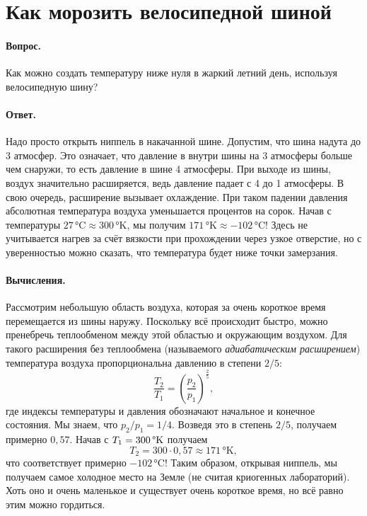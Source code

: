 \section{Как морозить велосипедной шиной}


\paragraph{Вопрос.}
Как можно создать температуру ниже нуля в жаркий летний день, используя велосипедную шину?

\paragraph{Ответ.}
Надо просто открыть ниппель в накачанной шине.
Допустим, что шина надута до 3 атмосфер.
Это означает, что давление в внутри шины на 3 атмосферы больше чем снаружи, то есть давление в шине 4 атмосферы.
При выходе из шины, воздух значительно расширяется, ведь давление падает с 4 до 1 атмосферы.
В свою очередь, расширение вызывает охлаждение.
При таком падении давления абсолютная температура воздуха уменьшается процентов на сорок.
Начав с температуры $27 \,\text{°C} \approx 300\, \text{°K}$, мы получим $171 \,\text{°K} \approx -102\, \text{°C}$!
Здесь не учитывается нагрев за счёт вязкости при прохождении через узкое отверстие, но с уверенностью можно сказать, что температура будет ниже точки замерзания.

\paragraph{Вычисления.}
Рассмотрим небольшую область воздуха, которая за очень короткое время перемещается из шины наружу.
Поскольку всё происходит быстро, можно пренебречь теплообменом между этой областью и окружающим воздухом.
Для такого расширения без теплообмена (называемого \emph{адиабатическим расширением}) температура воздуха пропорциональна давлению в степени $2/5$:
\[\frac{T_2}{T_1}=\left(\frac{p_2}{p_1}\right)^{\tfrac{2}{5}},\]
где индексы температуры и давления обозначают начальное и конечное состояния.
Мы знаем, что $p_2/p_1=1/4$.
Возведя это в степень $2/5$, получаем примерно $0{,}57$.
Начав с $T_1=300 \,\degree\text{K}$ получаем
\[T_2=300 \cdot 0{,}57 \approx 171 \,\text{°K},\]
что соответствует примерно $-102\, \text{°C}$!
Таким образом, открывая ниппель, мы получаем самое холодное место на Земле (не считая криогенных лабораторий).
Хоть оно и очень маленькое и существует очень короткое время, но всё равно этим можно гордиться.
